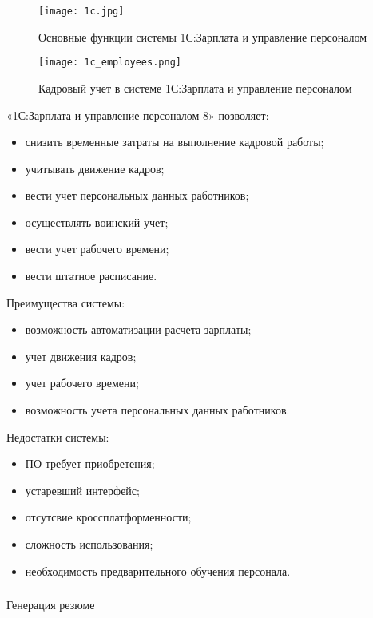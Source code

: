 \begin{figure}[!h]
	\centering
	\texttt{[image: 1c.jpg]} 
	\caption{Основные функции системы 1С:Зарплата и управление персоналом}
	\label{fig:analysis:analogues:1c}
\end{figure}

\begin{figure}[!h]
	\centering
	\texttt{[image: 1c\_employees.png]} 
	\caption{Кадровый учет в системе 1С:Зарплата и управление персоналом}
	\label{fig:analysis:analogues:1c_employees}
\end{figure}

«1С:Зарплата и управление персоналом 8» позволяет:
\begin{itemize}
	\item снизить временные затраты на выполнение кадровой работы;
	\item учитывать движение кадров;
	\item вести учет персональных данных работников;
	\item осуществлять воинский учет;
	\item вести учет рабочего времени;
	\item вести штатное расписание.
\end{itemize}

Преимущества системы:
\begin{itemize}
	\item возможность автоматизации расчета зарплаты;
	\item учет движения кадров;
	\item учет рабочего времени;
	\item возможность учета персональных данных работников.
\end{itemize}

Недостатки системы:
\begin{itemize}
	\item ПО требует приобретения;
	\item устаревший интерфейс;
	\item отсутсвие кроссплатформенности;
	\item сложность использования;
	\item необходимость предварительного обучения персонала.
\end{itemize}


\subsubsection{} Генерация резюме
\label{sec:analysis:analogues:generation}

